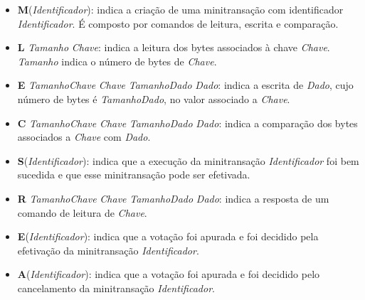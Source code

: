 \documentclass[11pt,twoside,a4paper]{book}
\begin{document}
\begin{itemize}
\item \textbf{M}(\textit{Identificador}): indica a criação de uma minitransação com identificador \textit{Identificador}. É composto por comandos de leitura, escrita e comparação.

\item \textbf{L} \textit{Tamanho} \textit{Chave}: indica a leitura dos bytes associados à chave \textit{Chave}. \textit{Tamanho} indica o número de bytes de \textit{Chave}.

\item \textbf{E} \textit{TamanhoChave} \textit{Chave} \textit{TamanhoDado} \textit{Dado}: indica a escrita de \textit{Dado}, cujo número de bytes é \textit{TamanhoDado}, no valor associado a \textit{Chave}.

\item \textbf{C} \textit{TamanhoChave} \textit{Chave} \textit{TamanhoDado} \textit{Dado}: indica a comparação dos bytes associados a \textit{Chave} com \textit{Dado}.

\item \textbf{S}(\textit{Identificador}): indica que a execução da minitransação \textit{Identificador} foi bem sucedida e que esse minitransação pode ser efetivada.

\item \textbf{R} \textit{TamanhoChave} \textit{Chave} \textit{TamanhoDado} \textit{Dado}: indica a resposta de um comando de leitura de \textit{Chave}.

\item \textbf{E}(\textit{Identificador}): indica que a votação foi apurada e foi decidido pela efetivação da minitransação \textit{Identificador}.

\item \textbf{A}(\textit{Identificador}): indica que a votação foi apurada e foi decidido pelo cancelamento da minitransação \textit{Identificador}.

\end{itemize}

\end{document}
